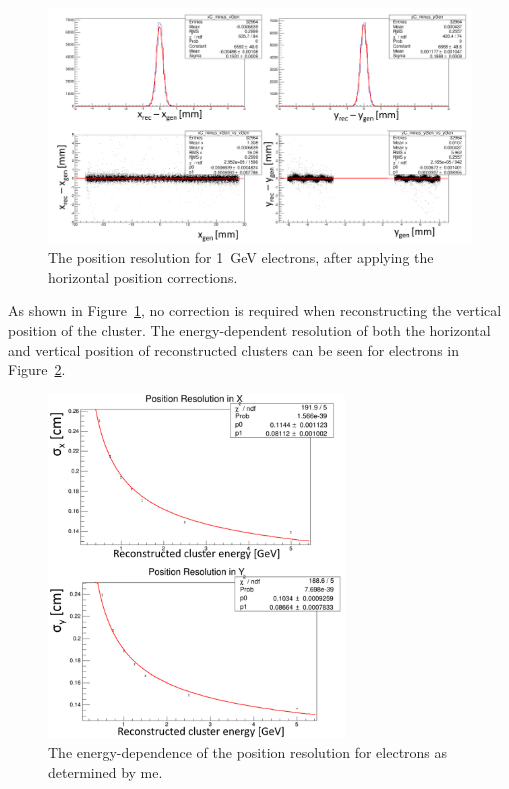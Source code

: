 \begin{figure}[htb]
  \centering
      \includegraphics[width=1.0\textwidth]{pics/performance/corrPosnsFits.png}
  \caption[Position resolution for 1~GeV electrons.]{The position resolution for 1~GeV electrons, after applying the horizontal position corrections.}
  \label{Figure:corrPosnsFits}
\end{figure}

As shown in Figure~\ref{Figure:corrPosnsFits}, no correction is required when reconstructing the vertical position of the cluster. The energy-dependent resolution of both the horizontal and vertical position of reconstructed clusters can be seen for electrons in Figure~\ref{Figure:emPosnResn}. 

\begin{figure}[htb]
  \centering
      \includegraphics[width=0.7\textwidth]{pics/performance/emPosnResn.png}
  \caption[Energy-dependent position resolution for electrons.]{The energy-dependence of the position resolution for electrons as determined by me.}
  \label{Figure:emPosnResn}
\end{figure}

